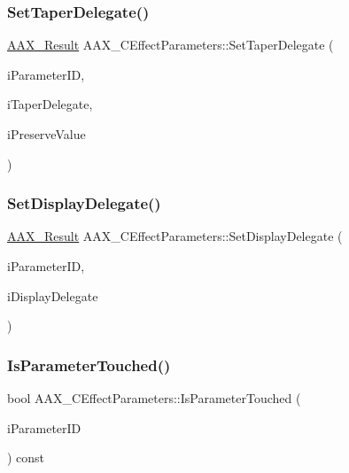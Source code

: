 \subsubsection{\texorpdfstring{SetTaperDelegate()}{SetTaperDelegate()}}
{\footnotesize\ttfamily \mbox{\hyperlink{a00392_a4d8f69a697df7f70c3a8e9b8ee130d2f}{A\+A\+X\+\_\+\+Result}} A\+A\+X\+\_\+\+C\+Effect\+Parameters\+::\+Set\+Taper\+Delegate (\begin{DoxyParamCaption}\item[{\mbox{\hyperlink{a00392_a1440c756fe5cb158b78193b2fc1780d1}{A\+A\+X\+\_\+\+C\+Param\+ID}}}]{i\+Parameter\+ID,  }\item[{\mbox{\hyperlink{a01877}{A\+A\+X\+\_\+\+I\+Taper\+Delegate\+Base}} \&}]{i\+Taper\+Delegate,  }\item[{bool}]{i\+Preserve\+Value }\end{DoxyParamCaption})\hspace{0.3cm}{\ttfamily [protected]}}

\mbox{\label{a01481_ad4aeb081bffb2414182251d4e41c1ed2}} 
\subsubsection{\texorpdfstring{SetDisplayDelegate()}{SetDisplayDelegate()}}
{\footnotesize\ttfamily \mbox{\hyperlink{a00392_a4d8f69a697df7f70c3a8e9b8ee130d2f}{A\+A\+X\+\_\+\+Result}} A\+A\+X\+\_\+\+C\+Effect\+Parameters\+::\+Set\+Display\+Delegate (\begin{DoxyParamCaption}\item[{\mbox{\hyperlink{a00392_a1440c756fe5cb158b78193b2fc1780d1}{A\+A\+X\+\_\+\+C\+Param\+ID}}}]{i\+Parameter\+ID,  }\item[{\mbox{\hyperlink{a01797}{A\+A\+X\+\_\+\+I\+Display\+Delegate\+Base}} \&}]{i\+Display\+Delegate }\end{DoxyParamCaption})\hspace{0.3cm}{\ttfamily [protected]}}

\mbox{\label{a01481_a7ee10904c6933cbf82b6050044fa15eb}} 
\subsubsection{\texorpdfstring{IsParameterTouched()}{IsParameterTouched()}}
{\footnotesize\ttfamily bool A\+A\+X\+\_\+\+C\+Effect\+Parameters\+::\+Is\+Parameter\+Touched (\begin{DoxyParamCaption}\item[{\mbox{\hyperlink{a00392_a1440c756fe5cb158b78193b2fc1780d1}{A\+A\+X\+\_\+\+C\+Param\+ID}}}]{i\+Parameter\+ID }\end{DoxyParamCaption}) const\hspace{0.3cm}{\ttfamily [protected]}}

